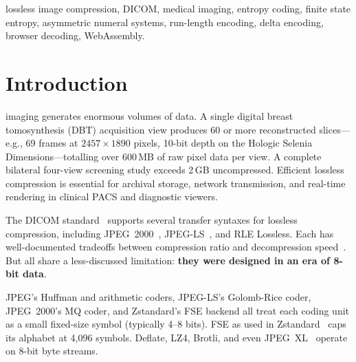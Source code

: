 \documentclass[journal]{IEEEtran}
\begin{document}
\begin{abstract}
We evaluate MIC on 21 clinical DICOM datasets spanning MR, CT, CR, X-ray,
mammography, nuclear medicine, radiography, secondary capture, and fluoroscopy
(XA) using fair in-process benchmarking via CGO bindings against HTJ2K
(OpenJPH), JPEG-LS (CharLS), and Delta+Zstandard. MIC achieves compression
ratios of 1.7$\times$--8.9$\times$. MIC-4state-C exceeds HTJ2K decompression
speed on 19/21 images single-threaded (ARM64) and 16/21 (AMD64, AVX2). PICS-C-8
exceeds HTJ2K on \textbf{all 21 images} on both platforms.
\end{abstract}

\begin{IEEEkeywords}
lossless image compression, DICOM, medical imaging, entropy coding,
finite state entropy, asymmetric numeral systems, run-length encoding,
delta encoding, browser decoding, WebAssembly.
\end{IEEEkeywords}

\section{Introduction}
\label{sec:intro}

 imaging generates enormous volumes of data. A single
digital breast tomosynthesis (DBT) acquisition view produces 60 or more
reconstructed slices---e.g., 69 frames at $2457 \times 1890$ pixels, 10-bit
depth on the Hologic Selenia Dimensions---totalling over 600\,MB of raw pixel
data per view. A complete bilateral four-view screening study exceeds 2\,GB
uncompressed. Efficient lossless compression is essential for archival storage,
network transmission, and real-time rendering in clinical PACS and diagnostic
viewers.

The DICOM standard~\cite{dicom} supports several transfer syntaxes for lossless
compression, including JPEG~2000~\cite{taubman2002}, JPEG-LS~\cite{loco1}, and
RLE Lossless. Each has well-documented tradeoffs between compression ratio and
decompression speed~\cite{liu2017,clunie2000}. But all share a less-discussed
limitation: \textbf{they were designed in an era of 8-bit data}.

JPEG's Huffman and arithmetic coders, JPEG-LS's Golomb-Rice coder, JPEG~2000's
MQ coder, and Zstandard's FSE backend all treat each coding unit as a small
fixed-size symbol (typically 4--8 bits). FSE as used in Zstandard~\cite{rfc8878}
caps its alphabet at 4,096 symbols. Deflate, LZ4, Brotli, and even
JPEG~XL~\cite{jpegxl} operate on 8-bit byte streams.
\end{document}
